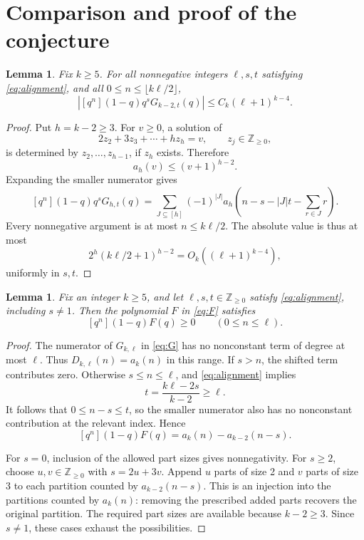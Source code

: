 \documentclass[3p,11pt,number]{elsarticle}
\newtheorem{lemma}[theorem]{Lemma}
\theoremstyle{remark}
\numberwithin{equation}{section}
\newcommand{\NN}{\mathbb Z_{\ge0}}
\newcommand{\coeff}[1]{[q^{#1}]}
\begin{document}
\section{Comparison and proof of the conjecture}

\begin{lemma}\label{lem:small}
Fix \(k\ge5\).
For all nonnegative integers \(\ell,s,t\) satisfying
\eqref{eq:alignment}, and all \(0\le n\le\lfloor k\ell/2\rfloor\),
\begin{equation}\label{eq:small}
\left|\coeff{n}(1-q)q^sG_{k-2,t}(q)\right|
\le C_k(\ell+1)^{k-4}.
\end{equation}
\end{lemma}

\begin{proof}
Put \(h=k-2\ge3\).
For \(v\ge0\), a solution of
\[
2z_2+3z_3+\cdots+hz_h=v,\qquad z_j\in\NN,
\]
is determined by \(z_2,\ldots,z_{h-1}\), if \(z_h\) exists.
Therefore
\[
a_h(v)\le(v+1)^{h-2}.
\]
Expanding the smaller numerator gives
\[
\coeff{n}(1-q)q^sG_{h,t}(q)
=\sum_{J\subseteq[h]}(-1)^{|J|}
a_h\left(n-s-|J|t-\sum_{r\in J}r\right).
\]
Every nonnegative argument is at most \(n\le k\ell/2\).
The absolute value is thus at most
\[
2^h(k\ell/2+1)^{h-2}
=O_k((\ell+1)^{k-4}),
\]
uniformly in \(s,t\).
\end{proof}

\begin{lemma}\label{lem:edge}
Fix an integer \(k\ge5\), and let \(\ell,s,t\in\NN\) satisfy
\eqref{eq:alignment}, including \(s\ne1\).
Then the polynomial \(F\) in \eqref{eq:F} satisfies
\begin{equation}\label{eq:edge}
\coeff{n}(1-q)F(q)\ge0\qquad(0\le n\le\ell).
\end{equation}
\end{lemma}

\begin{proof}
The numerator of \(G_{k,\ell}\) in \eqref{eq:G} has no nonconstant
term of degree at most \(\ell\). Thus
\(D_{k,\ell}(n)=a_k(n)\) in this range.
If \(s>n\), the shifted term contributes zero.
Otherwise \(s\le n\le\ell\), and \eqref{eq:alignment} implies
\[
t=\frac{k\ell-2s}{k-2}\ge\ell.
\]
It follows that \(0\le n-s\le t\), so the smaller numerator also has
no nonconstant contribution at the relevant index. Hence
\begin{equation}\label{eq:edge-difference}
\coeff{n}(1-q)F(q)=a_k(n)-a_{k-2}(n-s).
\end{equation}

For \(s=0\), inclusion of the allowed part sizes gives nonnegativity.
For \(s\ge2\), choose \(u,v\in\NN\) with \(s=2u+3v\).
Append \(u\) parts of size 2 and \(v\) parts of size 3 to each
partition counted by \(a_{k-2}(n-s)\).
This is an injection into the partitions counted by \(a_k(n)\):
removing the prescribed added parts recovers the original partition.
The required part sizes are available because \(k-2\ge3\).
Since \(s\ne1\), these cases exhaust the possibilities.
\end{proof}
\end{document}
